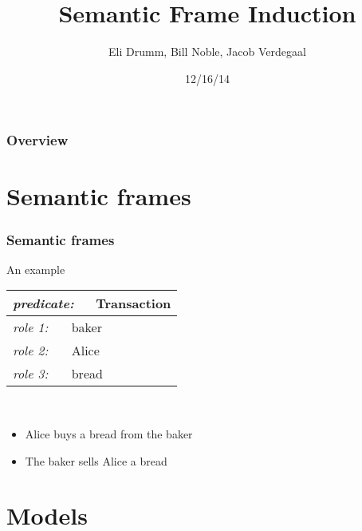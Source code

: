 \documentclass{beamer}
\title[Semantic Frame Induction]{Semantic Frame Induction} %
\author{Eli Drumm, Bill Noble, Jacob Verdegaal} %
\institute[UvA] %
{
University of Amsterdam \\ %
\medskip

}
\date{12/16/14}
\begin{document}
\begin{frame}
\titlepage 
\end{frame}

\begin{frame}
\frametitle{Overview} 
\tableofcontents 
\end{frame}


\section{Semantic frames}


\begin{frame}
  \frametitle{Semantic frames}
  An example\\
  \vspace{10pt}
\begin{tabular}{|l|}
  \hline
  \textit{\small predicate:\normalsize}~~~Transaction\\
  \hline
  \hline
  \textit{\small role 1:\normalsize}~~~ baker\\
  \textit{\small role 2:\normalsize}~~~ Alice\\
  \textit{\small role 3:\normalsize}~~~ bread\\
  \hline
\end{tabular}\\
\vfill
\begin{itemize}
\item Alice buys a bread from the baker
\item The baker sells Alice a bread
  \end{itemize}
\end{frame}

\section{Models}
\end{document}
